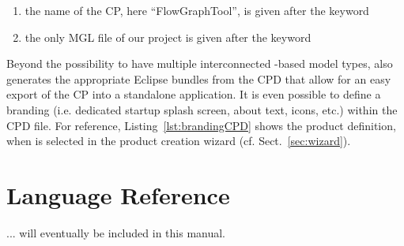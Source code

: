 \documentclass[a4paper,american,12pt]{scrreprt}
\begin{document}
\begin{enumerate}
\item the name of the CP, here ``FlowGraphTool'', is given after the
 keyword
\item the only MGL file of our project is given after the  keyword
\end{enumerate}


Beyond the possibility to have multiple interconnected \cinco{}-based model
types, \cinco{} also generates the appropriate Eclipse bundles from the CPD
that allow for an easy export of the CP into a standalone application.  It is
even possible to define a branding (i.e. dedicated startup splash screen, about
text, icons, etc.) within the CPD file. For reference,
Listing~\ref{lst:brandingCPD} shows the product definition, when  is selected in the \cinco{} product creation wizard (cf.
Sect.~\ref{sec:wizard}).






\chapter{Language Reference}

... will eventually be included in this manual.


%
%




\end{document}
